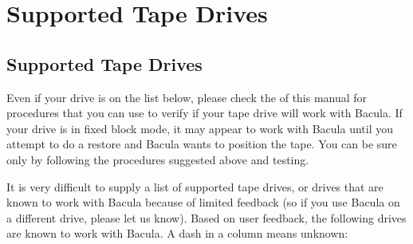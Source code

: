 
\section*{Supported Tape Drives}
\label{_ChapterStart19}

\subsection*{Supported Tape Drives}
\label{SupportedDrives}

Even if your drive is on the list below, please check the 
 of this manual for
procedures that you can use to verify if your tape drive will work with
Bacula. If your drive is in fixed block mode, it may appear to work with
Bacula until you attempt to do a restore and Bacula wants to position the
tape. You can be sure only by following the procedures suggested above and
testing. 

It is very difficult to supply a list of supported tape drives, or drives that
are known to work with Bacula because of limited feedback (so if you use
Bacula on a different drive, please let us know). Based on user feedback, the
following drives are known to work with Bacula. A dash in a column means
unknown: 

